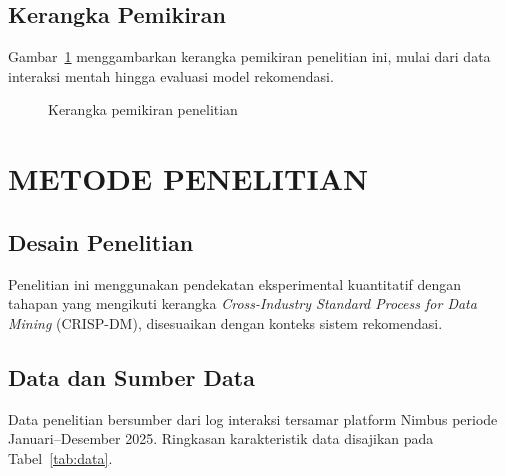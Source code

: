 \documentclass[12pt,a4paper]{report}
\begin{document}
\begin{onehalfspace}
\section{Kerangka Pemikiran}
Gambar~\ref{fig:kerangka} menggambarkan kerangka pemikiran penelitian ini,
mulai dari data interaksi mentah hingga evaluasi model rekomendasi.

\begin{figure}[htb]
\centering
{}
\caption{Kerangka pemikiran penelitian}
\label{fig:kerangka}
\end{figure}

\chapter{METODE PENELITIAN}

\section{Desain Penelitian}
Penelitian ini menggunakan pendekatan eksperimental kuantitatif dengan
tahapan yang mengikuti kerangka \emph{Cross-Industry Standard Process for
Data Mining} (CRISP-DM), disesuaikan dengan konteks sistem rekomendasi.

\section{Data dan Sumber Data}
Data penelitian bersumber dari log interaksi tersamar platform Nimbus
periode Januari--Desember 2025. Ringkasan karakteristik data disajikan
pada Tabel~\ref{tab:data}.


\end{onehalfspace}
\end{document}
